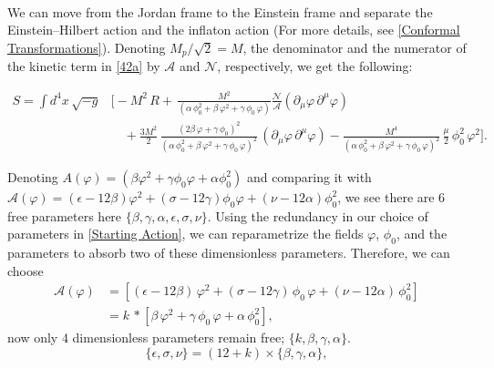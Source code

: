\documentclass[aps,prd,reprint,preprintnumbers,showpacs,floatfix,nofootinbib,superscript address]{revtex4-2}
\begin{document}
\\
We can move from the Jordan frame to the Einstein frame and separate the Einstein--Hilbert action and the inflaton action (For more details, see \cref{Conformal Transformations}). Denoting $M_p/\sqrt{2} = M$, the denominator and the numerator of the kinetic term in \cref{42a} by $\mathcal{A}$ and $\mathcal{N}$, respectively, we get the following:
\begin{widetext}
    \begin{equation}    \label{33a}
    \begin{aligned}
        S = \int d^4x\, \sqrt{-g} &\Biggl[- M^2\, R + \,\frac{M^2}{(\alpha\,\phi_0^2+\beta\,\varphi^2+\gamma\,\phi_0\,\varphi)}
        \frac{\mathcal{N}}{\mathcal{A}} (\partial_{\mu}\varphi\,\partial^{\mu}\varphi) \\[2mm]
        &\quad + \frac{3M^2}{2}\,\frac{(2\beta\,\varphi+\gamma\,\phi_0)^2}{(\alpha\,\phi_0^2+\beta\,\varphi^2+\gamma\,\phi_0\,\varphi)^2}\,(\partial_{\mu}\varphi\,\partial^{\mu}\varphi) - \frac{M^4}{(\alpha\,\phi_0^2+\beta\,\varphi^2+\gamma\,\phi_0\,\varphi)^2}\,\frac{\mu}{2}\,\phi_0^2\,\varphi^2 \Biggr].
    \end{aligned}
    \end{equation}
\end{widetext}
Denoting $A(\varphi) = (\beta\varphi^2+\gamma\phi_0\varphi+\alpha\phi_0^2)$ and comparing it with $\mathcal{A}(\varphi) = (\epsilon - 12\beta) \varphi^2 + (\sigma - 12\gamma) \phi_0  \varphi + (\nu - 12\alpha)\phi^2_0$, we see there are 6 free parameters here $\{ \beta, \gamma, \alpha , \epsilon, \sigma, \nu \}$. Using the redundancy in our choice of parameters in \cref{Starting Action}, we can reparametrize the fields $\varphi$, $\phi_0$, and the parameters to absorb two of these dimensionless parameters. Therefore, we can choose
\begin{equation}
\begin{split}
\mathcal{A}(\varphi) &= \left[(\epsilon - 12\beta)\,\varphi^2 + (\sigma - 12\gamma)\,\phi_0\,\varphi + (\nu - 12\alpha)\,\phi_0^2\right] \\
         &= k\,*\left[\beta\,\varphi^2 + \gamma\,\phi_0\,\varphi + \alpha\,\phi_0^2\right],
\end{split}    
\end{equation}
now only 4 dimensionless parameters remain free; $\{k, \beta, \gamma, \alpha \}$.
\begin{equation} \label{Variable Dictionary}
    \{ \epsilon , \sigma, \nu\} = (12+k) \times \{\beta , \gamma ,\alpha \},    
\end{equation}
\end{document}
